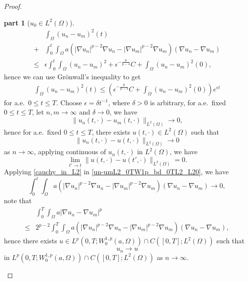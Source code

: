 \documentclass[11pt]{amsart}
\theoremstyle{definition}
\newtheorem{proofpart}{part}
\numberwithin{equation}{section}
\newcommand*\abs[1]{\lvert#1\rvert}
\newcommand*\norm[1]{\lVert#1\rVert}
\begin{document}
\begin{proof}
\begin{proofpart}[$u_0 \in L^2(\Omega)$]
	\begin{equation}
		\begin{split}
			& \int_{\Omega}\left(u_n-u_m\right)^2(t)\\
			+{} & \int_{0}^{t}\int_{\Omega}a
			\left(\abs{\nabla u_n}^{p-2}\nabla u_n
			- \abs{\nabla u_m}^{p-2}\nabla u_m\right)
			\left(\nabla u_n - \nabla u_m\right)\\
			\leq{} & \epsilon\int_0^t\int_{\Omega}
			\left(u_n-u_m\right)^2
			+ \epsilon^{-\frac{p}{p-4}}C
			+ \int_{\Omega}\left(u_n-u_m\right)^2(0),
		\end{split}
	\end{equation}
	hence we can use Gr\"onwall's inequality to get
	\begin{equation}\label{un-umL2_gronwall}
		\begin{split}
			\int_{\Omega}\left( u_n-u_m \right)^2(t)
			\leq \left( 
				\epsilon^{-\frac{p}{p-4}}C
				+ \int_{\Omega}\left(u_n-u_m\right)^2(0)
				\right)e^{\epsilon t}
		\end{split}
	\end{equation}
	for a.e.\ $0 \leq t \leq T$. Choose $\epsilon = \delta t^{-1}$,
	where $\delta > 0$ is arbitrary, for a.e.\ fixed $0 \leq t \leq T$,
	let $n,m \to \infty$ and $\delta \to 0$, we have
	\begin{equation}\label{cauchy_in_L2}
		\norm{u_n(t,\cdot)-u_m(t,\cdot)}_{L^2(\Omega)} \to 0,
	\end{equation}
	hence for a.e.\ fixed $0 \leq t \leq T$, there exists
	$u(t,\cdot) \in L^2(\Omega)$ such that
	\begin{equation}
		\norm{u_n(t,\cdot)-u(t,\cdot)}_{L^2(\Omega)} \to 0
	\end{equation}
	as $n \to \infty$, applying continuous of $u_n(t, \cdot)$
	in $L^2(\Omega)$, we have
	\begin{equation}
		\lim_{t' \to t}\norm{u(t,\cdot)-u(t',\cdot)}_{L^2(\Omega)}=0.
	\end{equation}
	Applying \cref{cauchy_in_L2} in \cref{un-umL2_0TW1p_bd_0TL2_L20},
	we have
	\begin{equation}\label{cauchy_in_W1pa}
		\int_{0}^{t}\int_{\Omega}a
		\left(\abs{\nabla u_n}^{p-2}\nabla u_n
		- \abs{\nabla u_m}^{p-2}\nabla u_m\right)
		\left(\nabla u_n - \nabla u_m\right)
		\to 0,
	\end{equation}
	note that
	\begin{equation}
		\begin{split}
			& \int_0^T\int_{\Omega}a\abs{\nabla u_n - \nabla u_m}^p\\
			\leq{} & 2^{p-2}\int_{0}^{T}\int_{\Omega}a
			\left(\abs{\nabla u_n}^{p-2}\nabla u_n
			- \abs{\nabla u_m}^{p-2}\nabla u_m\right)
			\left(\nabla u_n - \nabla u_m\right),
		\end{split}
	\end{equation}
	hence there exists $u \in L^p(0, T; W_0^{1,p}(a,\Omega))
	\cap C([0, T]; L^2(\Omega))$ such that
	\begin{equation}
		u_{n} \to u
	\end{equation}
	in $L^p(0, T; W_0^{1,p}(a,\Omega))\cap C([0, T]; L^2(\Omega))$
	as $n \to \infty$.


\end{proofpart}
\end{proof}
\end{document}
